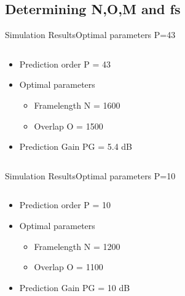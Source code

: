 \subsection{Determining N,O,M and fs}
\begin{frame}{Simulation Results}{Optimal parameters P=43}		
	\begin{columns}
		\begin{column}{0.4\textwidth}
			\begin{itemize}
				\item Prediction order P = 43
				\item Optimal parameters
				\begin{itemize}
					\item Framelength N = 1600
					\item Overlap O = 1500
				\end{itemize}
				\item Prediction Gain PG = 5.4 dB
			\end{itemize}
		\end{column}
		\begin{column}{0.6\textwidth} 
			\resizebox{0.9\columnwidth}{!}{		
				}
		\end{column}
	\end{columns}
\end{frame}

\begin{frame}{Simulation Results}{Optimal parameters P=10}		
	\begin{columns}
		\begin{column}{0.4\textwidth}
			\begin{itemize}
				\item Prediction order P = 10
				\item Optimal parameters
				\begin{itemize}
					\item Framelength N = 1200
					\item Overlap O = 1100
				\end{itemize}
				\item Prediction Gain PG = 10 dB
			\end{itemize}
		\end{column}
		\begin{column}{0.6\textwidth} 
			\resizebox{0.9\columnwidth}{!}{		
				}
		\end{column}
	\end{columns}
\end{frame}

